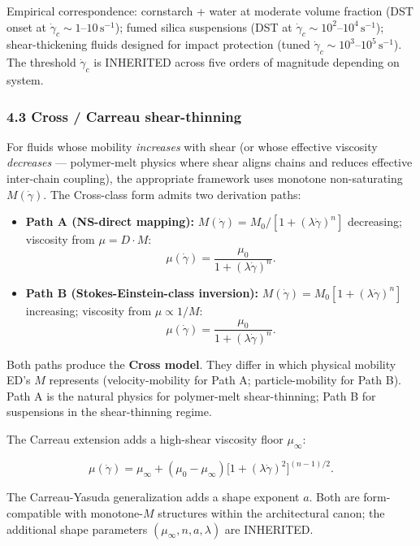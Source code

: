 \documentclass[
  11pt,a4paper]{article}
\begin{document}
Empirical correspondence: cornstarch + water at moderate volume fraction
(DST onset at \(\dot\gamma_c \sim 1\)--\(10\,\mathrm{s}^{-1}\)); fumed
silica suspensions (DST at
\(\dot\gamma_c \sim 10^2\)--\(10^4\,\mathrm{s}^{-1}\)); shear-thickening
fluids designed for impact protection (tuned
\(\dot\gamma_c \sim 10^3\)--\(10^5\,\mathrm{s}^{-1}\)). The threshold
\(\dot\gamma_c\) is INHERITED across five orders of magnitude depending
on system.

\subsubsection{4.3 Cross / Carreau
shear-thinning}\label{cross-carreau-shear-thinning}

For fluids whose mobility \emph{increases} with shear (or whose
effective viscosity \emph{decreases} --- polymer-melt physics where
shear aligns chains and reduces effective inter-chain coupling), the
appropriate framework uses monotone non-saturating \(M(\dot\gamma)\).
The Cross-class form admits two derivation paths:

\begin{itemize}
\item
  \textbf{Path A (NS-direct mapping):}
  \(M(\dot\gamma) = M_0/[1 + (\lambda \dot\gamma)^n]\) decreasing;
  viscosity from \(\mu = D \cdot M\):
  \[\mu(\dot\gamma) = \frac{\mu_0}{1 + (\lambda \dot\gamma)^n}.\]
\item
  \textbf{Path B (Stokes-Einstein-class inversion):}
  \(M(\dot\gamma) = M_0[1 + (\lambda \dot\gamma)^n]\) increasing;
  viscosity from \(\mu \propto 1/M\):
  \[\mu(\dot\gamma) = \frac{\mu_0}{1 + (\lambda \dot\gamma)^n}.\]
\end{itemize}

Both paths produce the \textbf{Cross model}. They differ in which
physical mobility ED's \(M\) represents (velocity-mobility for Path A;
particle-mobility for Path B). Path A is the natural physics for
polymer-melt shear-thinning; Path B for suspensions in the
shear-thinning regime.

The Carreau extension adds a high-shear viscosity floor \(\mu_\infty\):

\[\mu(\dot\gamma) = \mu_\infty + (\mu_0 - \mu_\infty)\bigl[1 + (\lambda \dot\gamma)^2\bigr]^{(n-1)/2}.\]

The Carreau-Yasuda generalization adds a shape exponent \(a\). Both are
form-compatible with monotone-\(M\) structures within the architectural
canon; the additional shape parameters \((\mu_\infty, n, a, \lambda)\)
are INHERITED.
\end{document}
